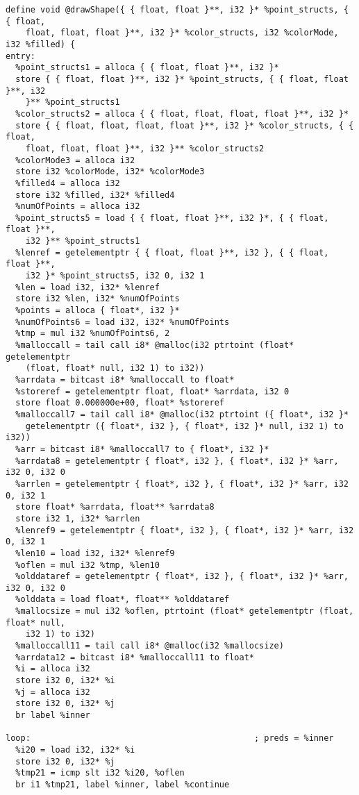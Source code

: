 \documentclass[main.tex]{subfiles}
\begin{document}
{\begin{lstlisting}
define void @drawShape({ { float, float }**, i32 }* %point_structs, { { float, 
    float, float, float }**, i32 }* %color_structs, i32 %colorMode, i32 %filled) {
entry:
  %point_structs1 = alloca { { float, float }**, i32 }*
  store { { float, float }**, i32 }* %point_structs, { { float, float }**, i32 
    }** %point_structs1
  %color_structs2 = alloca { { float, float, float, float }**, i32 }*
  store { { float, float, float, float }**, i32 }* %color_structs, { { float, 
    float, float, float }**, i32 }** %color_structs2
  %colorMode3 = alloca i32
  store i32 %colorMode, i32* %colorMode3
  %filled4 = alloca i32
  store i32 %filled, i32* %filled4
  %numOfPoints = alloca i32
  %point_structs5 = load { { float, float }**, i32 }*, { { float, float }**, 
    i32 }** %point_structs1
  %lenref = getelementptr { { float, float }**, i32 }, { { float, float }**, 
    i32 }* %point_structs5, i32 0, i32 1
  %len = load i32, i32* %lenref
  store i32 %len, i32* %numOfPoints
  %points = alloca { float*, i32 }*
  %numOfPoints6 = load i32, i32* %numOfPoints
  %tmp = mul i32 %numOfPoints6, 2
  %malloccall = tail call i8* @malloc(i32 ptrtoint (float* getelementptr 
    (float, float* null, i32 1) to i32))
  %arrdata = bitcast i8* %malloccall to float*
  %storeref = getelementptr float, float* %arrdata, i32 0
  store float 0.000000e+00, float* %storeref
  %malloccall7 = tail call i8* @malloc(i32 ptrtoint ({ float*, i32 }* 
    getelementptr ({ float*, i32 }, { float*, i32 }* null, i32 1) to i32))
  %arr = bitcast i8* %malloccall7 to { float*, i32 }*
  %arrdata8 = getelementptr { float*, i32 }, { float*, i32 }* %arr, i32 0, i32 0
  %arrlen = getelementptr { float*, i32 }, { float*, i32 }* %arr, i32 0, i32 1
  store float* %arrdata, float** %arrdata8
  store i32 1, i32* %arrlen
  %lenref9 = getelementptr { float*, i32 }, { float*, i32 }* %arr, i32 0, i32 1
  %len10 = load i32, i32* %lenref9
  %oflen = mul i32 %tmp, %len10
  %olddataref = getelementptr { float*, i32 }, { float*, i32 }* %arr, i32 0, i32 0
  %olddata = load float*, float** %olddataref
  %mallocsize = mul i32 %oflen, ptrtoint (float* getelementptr (float, float* null,
    i32 1) to i32)
  %malloccall11 = tail call i8* @malloc(i32 %mallocsize)
  %arrdata12 = bitcast i8* %malloccall11 to float*
  %i = alloca i32
  store i32 0, i32* %i
  %j = alloca i32
  store i32 0, i32* %j
  br label %inner

loop:                                             ; preds = %inner
  %i20 = load i32, i32* %i
  store i32 0, i32* %j
  %tmp21 = icmp slt i32 %i20, %oflen
  br i1 %tmp21, label %inner, label %continue


\end{lstlisting}}
\end{document}

